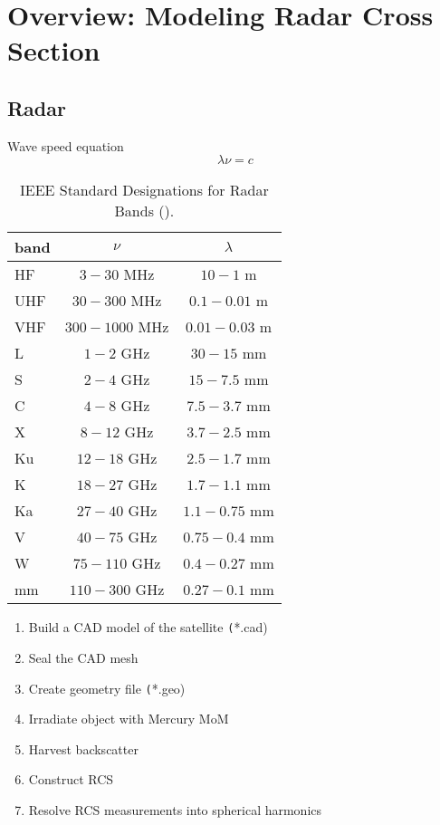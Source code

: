% 

\section{Overview: Modeling Radar Cross Section}

\subsection{Radar}
Wave speed equation
\begin{equation}
	\lambda \nu = c
\label{eq:wave-speed}
\end{equation}

\begin{table}[htp]
\begin{center}
\begin{tabular}{lcc
}
	band & \multicolumn{1}{c}{$\nu$} & \multicolumn{1}{c}{$\lambda$} \\\hline
	HF & $3-30$ MHz & $10-1$ m\\
	UHF & $30-300$ MHz & $0.1 - 0.01$ m\\
	VHF & $300 - 1000$ MHz & $0.01 - 0.03$ m\\
	L & $1 - 2$ GHz & $30 - 15$ mm \\
	S & $2 - 4$ GHz & $15 - 7.5$ mm  \\
	C & $4 - 8$ GHz & $7.5 - 3.7$ mm  \\
	X & $8 - 12$ GHz & $3.7 - 2.5$ mm  \\
	Ku & $12 - 18$ GHz & $2.5 - 1.7$ mm  \\
	K & $18 - 27$ GHz & $1.7 - 1.1$ mm  \\
	Ka & $27 - 40$ GHz & $1.1 - 0.75$ mm  \\
	V & $40 - 75$ GHz & $0.75 - 0.4$ mm  \\
	W & $75 - 110$ GHz & $0.4 - 0.27$ mm  \\
	mm & $110 - 300$ GHz & $0.27 - 0.1$ mm  \\
\end{tabular}
\caption{IEEE Standard Designations for Radar Bands (\cite{bruder2003ieee}).}
\end{center}
\label{tab:wavespeed}
\end{table}%


\begin{enumerate}[label=(\Alph*)]
	\item Build a CAD model of the satellite \texttt(*.cad)
	\item Seal the CAD mesh
	\item Create geometry file \texttt(*.geo)
	\item Irradiate object with Mercury MoM
	\item Harvest backscatter
	\item Construct RCS
	\item Resolve RCS measurements into spherical harmonics
\end{enumerate}

